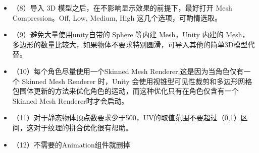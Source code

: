 \documentclass[9pt, b5paper]{article}
\begin{document}
\begin{itemize}
\begin{itemize}
\end{itemize}
\item （8）导入 3D 模型之后，在不影响显示效果的前提下，最好打开 Mesh Compression。Off, Low, Medium, High 这几个选项，可酌情选取。
\item （9）避免大量使用unity自带的 Sphere 等内建 Mesh，Unity 内建的 Mesh，多边形的数量比较大，如果物体不要求特别圆滑，可导入其他的简单3D模型代替。
\item （10）每个角色尽量使用一个Skinned Mesh Renderer,这是因为当角色仅有一个 Skinned Mesh Renderer 时，Unity 会使用视锥型可见性裁剪和多边形网格包围体更新的方法来优化角色的运动，而这种优化只有在角色仅含有一个 Skinned Mesh Renderer时才会启动。
\item （11）对于静态物体顶点数要求少于500，UV的取值范围不要超过（0,1）区间，这对于纹理的拼合优化很有帮助。
\item （12）不需要的Animation组件就删掉
\end{itemize}
\end{document}
